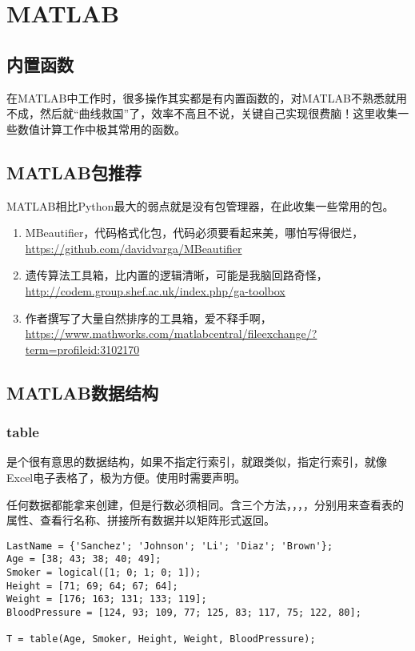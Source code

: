 \chapter{MATLAB}

\section{内置函数}

在MATLAB中工作时，很多操作其实都是有内置函数的，对MATLAB不熟悉就用不成，然后就“曲线救国”了，效率不高且不说，关键自己实现很费脑！这里收集一些数值计算工作中极其常用的函数。


\section{MATLAB包推荐}

MATLAB相比Python最大的弱点就是没有包管理器，在此收集一些常用的包。

\begin{enumerate}
    \item MBeautifier，代码格式化包，代码必须要看起来美，哪怕写得很烂，\url{https://github.com/davidvarga/MBeautifier}
    \item 遗传算法工具箱，比内置的逻辑清晰，可能是我脑回路奇怪，\url{http://codem.group.shef.ac.uk/index.php/ga-toolbox}
    \item 作者撰写了大量自然排序的工具箱，爱不释手啊，\url{https://www.mathworks.com/matlabcentral/fileexchange/?term=profileid:3102170}
\end{enumerate}

\section{MATLAB数据结构}

\subsection{table}

是个很有意思的数据结构，如果不指定行索引，就跟类似，指定行索引，就像Excel电子表格了，极为方便。使用时需要声明。

任何数据都能拿来创建，但是行数必须相同。含三个方法，，，，分别用来查看表的属性、查看行名称、拼接所有数据并以矩阵形式返回。

\begin{verbatim}
LastName = {'Sanchez'; 'Johnson'; 'Li'; 'Diaz'; 'Brown'};
Age = [38; 43; 38; 40; 49];
Smoker = logical([1; 0; 1; 0; 1]);
Height = [71; 69; 64; 67; 64];
Weight = [176; 163; 131; 133; 119];
BloodPressure = [124, 93; 109, 77; 125, 83; 117, 75; 122, 80];

T = table(Age, Smoker, Height, Weight, BloodPressure);
\end{verbatim}

